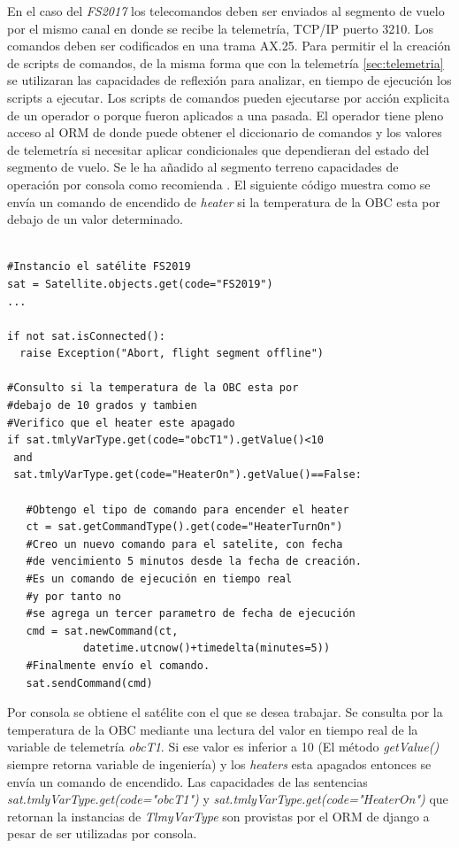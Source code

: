 \documentclass[twoside,twocolumn]{article}
\begin{document}
En el caso del \textit{FS2017} los telecomandos deben ser enviados al segmento de vuelo por el mismo canal en donde se recibe la telemetría, TCP/IP puerto 3210. Los comandos deben ser codificados en una trama AX.25. 
Para permitir el la creación de scripts de comandos, de la misma forma que con 
la telemetría \ref{sec:telemetria} se utilizaran las capacidades de reflexión 
para analizar, en tiempo de ejecución los scripts a ejecutar. Los scripts de 
comandos pueden ejecutarse por acción explicita de un operador o porque fueron 
aplicados a una pasada. 
El operador tiene pleno acceso al ORM de donde puede obtener el diccionario de comandos y los valores de telemetría si necesitar aplicar condicionales que dependieran del estado del segmento de vuelo. Se le ha añadido al segmento terreno capacidades de operación por consola como recomienda \cite{galal2001satellite}. El siguiente código muestra como se envía un comando de encendido de \textit{heater} si la temperatura de la OBC esta por debajo de un valor determinado.

\begin{verbatim}

#Instancio el satélite FS2019
sat = Satellite.objects.get(code="FS2019")
...

if not sat.isConnected():
  raise Exception("Abort, flight segment offline")

#Consulto si la temperatura de la OBC esta por 
#debajo de 10 grados y tambien
#Verifico que el heater este apagado
if sat.tmlyVarType.get(code="obcT1").getValue()<10 
 and 
 sat.tmlyVarType.get(code="HeaterOn").getValue()==False:
   
   #Obtengo el tipo de comando para encender el heater
   ct = sat.getCommandType().get(code="HeaterTurnOn")
   #Creo un nuevo comando para el satelite, con fecha 
   #de vencimiento 5 minutos desde la fecha de creación. 
   #Es un comando de ejecución en tiempo real 
   #y por tanto no 
   #se agrega un tercer parametro de fecha de ejecución
   cmd = sat.newCommand(ct, 
	        datetime.utcnow()+timedelta(minutes=5))
   #Finalmente envío el comando.
   sat.sendCommand(cmd)
\end{verbatim}

Por consola se obtiene el satélite con el que se desea trabajar. Se consulta por la temperatura de la OBC mediante una lectura del valor en tiempo real de la variable de telemetría \textit{obcT1}. Si ese valor es inferior a 10 (El método  \textit{getValue()} siempre retorna variable de ingeniería) y los \textit{heaters} esta apagados entonces se envía un comando de encendido.
Las capacidades de las sentencias \textit{sat.tmlyVarType.get(code="obcT1")} y \textit{sat.tmlyVarType.get(code="HeaterOn")} que retornan la instancias de \textit{TlmyVarType} son provistas por el ORM de django a pesar de ser utilizadas por consola. 
\end{document}
